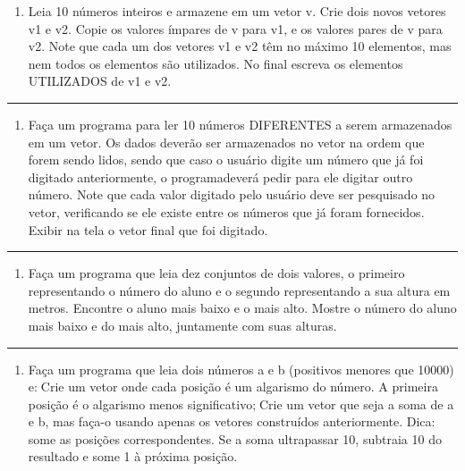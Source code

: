 \documentclass[12pt,a4paper]{article}
\providecommand{\tightlist}{%
      \setlength{\itemsep}{0pt}\setlength{\parskip}{0pt}}
\begin{document}
\begin{enumerate}
\def\labelenumi{\arabic{enumi}.}
\setcounter{enumi}{26}
\tightlist
\item
  Leia 10 números inteiros e armazene em um vetor v. Crie dois novos
  vetores v1 e v2. Copie os valores ímpares de v para v1, e os valores
  pares de v para v2. Note que cada um dos vetores v1 e v2 têm no máximo
  10 elementos, mas nem todos os elementos são utilizados. No final
  escreva os elementos UTILIZADOS de v1 e v2.
\end{enumerate}

    \begin{center}\rule{0.5\linewidth}{0.5pt}\end{center}

\begin{enumerate}
\def\labelenumi{\arabic{enumi}.}
\setcounter{enumi}{27}
\tightlist
\item
  Faça um programa para ler 10 números DIFERENTES a serem armazenados em
  um vetor. Os dados deverão ser armazenados no vetor na ordem que forem
  sendo lidos, sendo que caso o usuário digite um número que já foi
  digitado anteriormente, o programadeverá pedir para ele digitar outro
  número. Note que cada valor digitado pelo usuário deve ser pesquisado
  no vetor, verificando se ele existe entre os números que já foram
  fornecidos. Exibir na tela o vetor final que foi digitado.
\end{enumerate}

    \begin{center}\rule{0.5\linewidth}{0.5pt}\end{center}

\begin{enumerate}
\def\labelenumi{\arabic{enumi}.}
\setcounter{enumi}{28}
\tightlist
\item
  Faça um programa que leia dez conjuntos de dois valores, o primeiro
  representando o número do aluno e o segundo representando a sua altura
  em metros. Encontre o aluno mais baixo e o mais alto. Mostre o número
  do aluno mais baixo e do mais alto, juntamente com suas alturas.
\end{enumerate}

    \begin{center}\rule{0.5\linewidth}{0.5pt}\end{center}

\begin{enumerate}
\def\labelenumi{\arabic{enumi}.}
\setcounter{enumi}{29}
\tightlist
\item
  Faça um programa que leia dois números a e b (positivos menores que
  10000) e:Crie um vetor onde cada posição é um algarismo do número. A
  primeira posição é o algarismo menos significativo;Crie um vetor que
  seja a soma de a e b, mas faça-o usando apenas os vetores construídos
  anteriormente. Dica: some as posições correspondentes. Se a soma
  ultrapassar 10, subtraia 10 do resultado e some 1 à próxima posição.
\end{enumerate}
\end{document}
